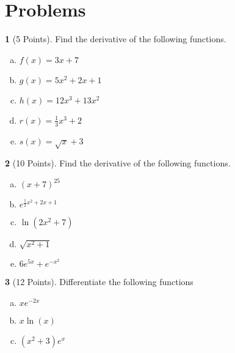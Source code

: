\documentclass[12pt]{amsart}
\theoremstyle{definition}
\newtheorem{thm}{}
\theoremstyle{definition}
\begin{document}
\newpage

\section{Problems}
\setcounter{thm}{0}
\begin{thm}[5 Points]
  Find the derivative of the following functions.
  \begin{enumerate}[(a)]
  \item
    $\displaystyle{f(x) = 3x + 7}$
    \vspace{1in}
  \item
    $\displaystyle{g(x) = 5x^2 + 2x + 1}$
    \vspace{1in}
  \item
    $\displaystyle{h(x) = 12x^3 + 13x^2}$
    \vspace{1in}
  \item
    $\displaystyle{r(x) = \frac{1}{3}x^3 + 2}$
    \vspace{1in}
  \item
    $\displaystyle{s(x) = \sqrt{x} + 3}$
    \vspace{1in}
  \end{enumerate}
\end{thm}

\newpage
\begin{thm}[10 Points]
  Find the derivative of the following functions.
  \begin{enumerate}[(a)]
  \item
    $\displaystyle{(x + 7)^{25}}$
    \vspace{1in}
  \item
    $\displaystyle{e^{\frac{1}{2}x^2 + 2x + 1}}$
    \vspace{1in}
  \item
    $\displaystyle{\ln(2x^2 + 7)}$
    \vspace{1in}
  \item
    $\displaystyle{\sqrt{x^2 + 1}}$
    \vspace{1in}
  \item
    $\displaystyle{6e^{5x} + e^{-x^2}}$
  \end{enumerate}
\end{thm}

\newpage

\begin{thm}[12 Points]
  Differentiate the following functions
  \begin{enumerate}[(a)]
  \item
    $\displaystyle{xe^{-2x}}$
    \vspace{2in}
  \item
    $\displaystyle{x\ln(x)}$
    \vspace{2in}
  \item
    $\displaystyle{(x^2 + 3)e^x}$
  \end{enumerate}
\end{thm}
\end{document}
